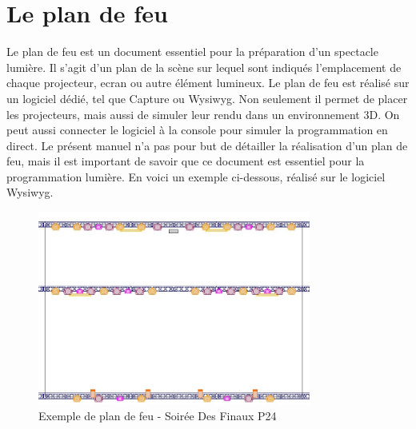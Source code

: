 \section{Le plan de feu}
\label{sec:plan_de_feu}

Le plan de feu est un document essentiel pour la préparation d'un spectacle lumière.
Il s'agit d'un plan de la scène sur lequel sont indiqués l'emplacement de chaque projecteur, ecran ou autre élément lumineux.
Le plan de feu est réalisé sur un logiciel dédié, tel que Capture ou Wysiwyg. Non seulement il permet de placer les projecteurs, mais aussi de simuler leur rendu dans un environnement 3D.
On peut aussi connecter le logiciel à la console pour simuler la programmation en direct.
\newline
Le présent manuel n'a pas pour but de détailler la réalisation d'un plan de feu, mais il est important de savoir que ce document est essentiel pour la programmation lumière.
En voici un exemple ci-dessous, réalisé sur le logiciel Wysiwyg.

\begin{figure}[H]
    \centering
    \includegraphics[width=0.8\textwidth]{2 - Généralités/Images/plan_de_feu.jpg}
    \caption{Exemple de plan de feu - Soirée Des Finaux P24}
    \label{fig:plan_de_feu}
\end{figure}
